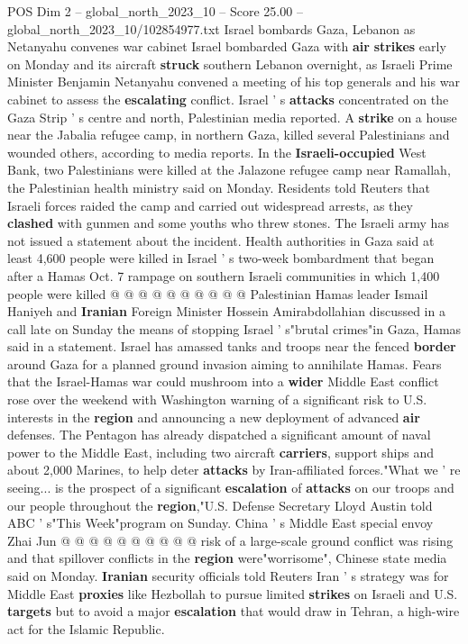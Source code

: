 \begin{textsample}{POS Dim 2 – global\_north\_2023\_10 – Score 25.00 – global\_north\_2023\_10/102854977.txt}  \label{ex:f2_pos_143}
Israel bombards Gaza, Lebanon as Netanyahu convenes war cabinet Israel bombarded Gaza with \textbf{air} \textbf{strikes} early on Monday and its aircraft \textbf{struck} southern Lebanon overnight, as Israeli Prime Minister Benjamin Netanyahu convened a meeting of his top generals and his war cabinet to assess the \textbf{escalating} conflict.
Israel ' s \textbf{attacks} concentrated on the Gaza Strip ' s centre and north, Palestinian media reported.
A \textbf{strike} on a house near the Jabalia refugee camp, in northern Gaza, killed several Palestinians and wounded others, according to media reports.
In the \textbf{Israeli-occupied} West Bank, two Palestinians were killed at the Jalazone refugee camp near Ramallah, the Palestinian health ministry said on Monday.
Residents told Reuters that Israeli forces raided the camp and carried out widespread arrests, as they \textbf{clashed} with gunmen and some youths who threw stones.
The Israeli army has not issued a statement about the incident.
Health authorities in Gaza said at least 4,600 people were killed in Israel ' s two-week bombardment that began after a Hamas Oct. 7 rampage on southern Israeli communities in which 1,400 people were killed @ @ @ @ @ @ @ @ @ @ Palestinian Hamas leader Ismail Haniyeh and \textbf{Iranian} Foreign Minister Hossein Amirabdollahian discussed in a call late on Sunday the means of stopping Israel ' s"brutal crimes"in Gaza, Hamas said in a statement.
Israel has amassed tanks and troops near the fenced \textbf{border} around Gaza for a planned ground invasion aiming to annihilate Hamas.
Fears that the Israel-Hamas war could mushroom into a \textbf{wider} Middle East conflict rose over the weekend with Washington warning of a significant risk to U.S. interests in the \textbf{region} and announcing a new deployment of advanced \textbf{air} defenses.
The Pentagon has already dispatched a significant amount of naval power to the Middle East, including two aircraft \textbf{carriers}, support ships and about 2,000 Marines, to help deter \textbf{attacks} by Iran-affiliated forces."What we ' re seeing... is the prospect of a significant \textbf{escalation} of \textbf{attacks} on our troops and our people throughout the \textbf{region},"U.S.
Defense Secretary Lloyd Austin told ABC ' s"This Week"program on Sunday.
China ' s Middle East special envoy Zhai Jun @ @ @ @ @ @ @ @ @ @ risk of a large-scale ground conflict was rising and that spillover conflicts in the \textbf{region} were"worrisome", Chinese state media said on Monday. \textbf{Iranian} security officials told Reuters Iran ' s strategy was for Middle East \textbf{proxies} like Hezbollah to pursue limited \textbf{strikes} on Israeli and U.S. \textbf{targets} but to avoid a major \textbf{escalation} that would draw in Tehran, a high-wire act for the Islamic Republic.

\end{textsample}
